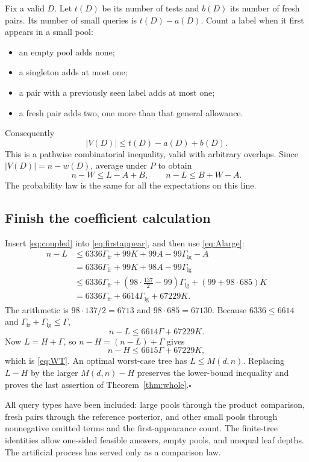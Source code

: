 \documentclass[11pt]{article}
\theoremstyle{definition}
\theoremstyle{remark}
\newcommand{\Glg}{\Gamma_{\mathrm{lg}}}
\newcommand{\Gfr}{\Gamma_{\mathrm{fr}}}
\numberwithin{equation}{section}
\begin{document}
Fix a valid \(D\). Let \(t(D)\) be its number of tests and \(b(D)\)
its number of fresh pairs. Its number of small queries is
\(t(D)-a(D)\).
Count a label when it first appears in a small pool:
\begin{itemize}
\item an empty pool adds none;
\item a singleton adds at most one;
\item a pair with a previously seen label adds at most one;
\item a fresh pair adds two, one more than that general allowance.
\end{itemize}
Consequently
\[
 |V(D)|\le t(D)-a(D)+b(D).
\]
This is a pathwise combinatorial inequality, valid with arbitrary
overlaps. Since \(|V(D)|=n-w(D)\), average under \(P\) to obtain
\begin{equation}\label{eq:firstappear}
 n-W\le L-A+B,\qquad n-L\le B+W-A.
\end{equation}
The probability law is the same for all the expectations on this line.

\subsection{Finish the coefficient calculation}

Insert \eqref{eq:coupled} into \eqref{eq:firstappear}, and then use
\eqref{eq:Alarge}:
\begin{align*}
 n-L
 &\le6336\Gfr+99K+99A-99\Glg-A\\
 &=6336\Gfr+99K+98A-99\Glg\\
 &\le6336\Gfr+
       \left(98\cdot\frac{137}{2}-99\right)\Glg
       +(99+98\cdot685)K\\
 &=6336\Gfr+6614\Glg+67229K.
\end{align*}
The arithmetic is \(98\cdot137/2=6713\) and
\(98\cdot685=67130\).
Because \(6336\le6614\) and \(\Gfr+\Glg\le\Gamma\),
\[
 n-L\le6614\Gamma+67229K.
\]
Now \(L=H+\Gamma\), so \(n-H=(n-L)+\Gamma\) gives
\[
 n-H\le6615\Gamma+67229K,
\]
which is \eqref{eq:WT}. An optimal worst-case tree has
\(L\le M(d,n)\). Replacing \(L-H\) by the larger \(M(d,n)-H\)
preserves the lower-bound inequality and proves the last assertion
of Theorem~\ref{thm:whole}.\quad\hfill\(\square\)

All query types have been included: large pools through the product
comparison, fresh pairs through the reference posterior, and other
small pools through nonnegative omitted terms and the first-appearance
count. The finite-tree identities allow one-sided feasible answers,
empty pools, and unequal leaf depths. The artificial process has
served only as a comparison law.
\end{document}
